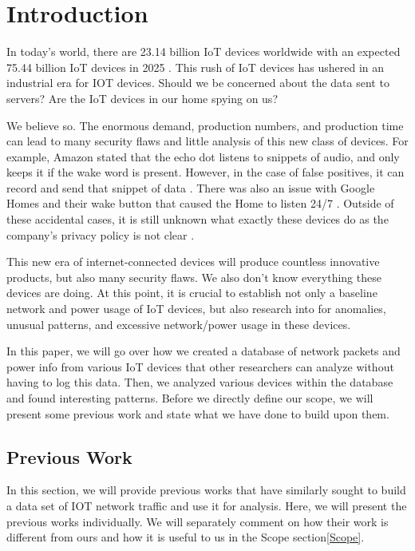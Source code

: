 \chapter{Introduction}
\label{Introduction}
In today's world, there are 23.14 billion IoT devices worldwide with an expected 75.44 billion IoT devices in 2025 \cite{statista_2016}. This rush of IoT devices has ushered in an industrial era for IOT devices. Should we be concerned about the data sent to servers? Are the IoT devices in our home spying on us?

We believe so. The enormous demand, production numbers, and production time can lead to many security flaws and little analysis of this new class of devices. For example, Amazon stated that the echo dot listens to snippets of audio, and only keeps it if the wake word is present. However, in the case of false positives, it can record and send that snippet of data \cite{kruzel_2018}. There was also an issue with Google Homes and their wake button that caused the Home to listen 24/7 \cite{burke_2017}. Outside of these accidental cases, it is still unknown what exactly these devices do as the company's privacy policy is not clear \cite{kruzel_2018}.

This new era of internet-connected devices will produce countless innovative products, but also many security flaws. We also don't know everything these devices are doing. At this point, it is crucial to establish not only a baseline network and power usage of IoT devices, but also research into for anomalies, unusual patterns, and excessive network/power usage in these devices.

In this paper, we will go over how we created a database of network packets and power info from various IoT devices that other researchers can analyze without having to log this data. Then, we analyzed various devices within the database and found interesting patterns. Before we directly define our scope, we will present some previous work and state what we have done to build upon them.

\section{Previous Work}
In this section, we will provide previous works that have similarly sought to build a data set of IOT network traffic and use it for analysis. Here, we will present the previous works individually. We will separately comment on how their work is different from ours and how it is useful to us in the Scope section\ref{Scope}.

